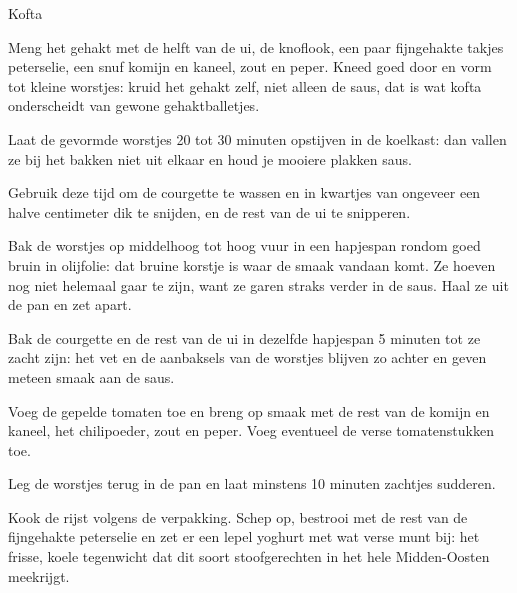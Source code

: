 \begin{recipe}{Kofta}
\begin{steps}
  \item Meng het gehakt met de helft van de ui, de knoflook, een paar fijngehakte
        takjes peterselie, een snuf komijn en kaneel, zout en peper. Kneed goed door
        en vorm tot kleine worstjes: kruid het gehakt zelf, niet alleen de saus, dat is
        wat kofta onderscheidt van gewone gehaktballetjes.
  \item Laat de gevormde worstjes 20 tot 30 minuten opstijven in de koelkast:
        dan vallen ze bij het bakken niet uit elkaar en houd je mooiere
        plakken saus.
  \item Gebruik deze tijd om de courgette te wassen en in kwartjes van ongeveer een halve
        centimeter dik te snijden, en de rest van de ui te snipperen.
  \item Bak de worstjes op middelhoog tot hoog vuur in een hapjespan rondom goed bruin
        in olijfolie: dat bruine korstje is waar de smaak vandaan komt. Ze hoeven nog niet
        helemaal gaar te zijn, want ze garen straks verder in de saus. Haal ze uit de pan
        en zet apart.
  \item Bak de courgette en de rest van de ui in dezelfde hapjespan 5 minuten
        tot ze zacht zijn: het vet en de aanbaksels van de worstjes blijven
        zo achter en geven meteen smaak aan de saus.
  \item Voeg de gepelde tomaten toe en breng op smaak met de rest van de komijn en kaneel,
        het chilipoeder, zout en peper. Voeg eventueel de verse tomatenstukken toe.
  \item Leg de worstjes terug in de pan en laat minstens 10 minuten zachtjes sudderen.
  \item Kook de rijst volgens de verpakking. Schep op, bestrooi met de rest van de
        fijngehakte peterselie en zet er een lepel yoghurt met wat verse munt bij: het
        frisse, koele tegenwicht dat dit soort stoofgerechten in het hele
        Midden-Oosten meekrijgt.
\end{steps}

\end{recipe}
